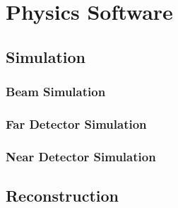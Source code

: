 \section{Physics Software}
\label{sec:detectors-sc-physics-software}

\subsection{Simulation}
\label{sec:detectors-sc-physics-software-simulation}

\subsubsection{Beam Simulation}
\label{sec:detectors-sc-physics-software-simulation-beam}

\subsubsection{Far Detector Simulation}
\label{sec:detectors-sc-physics-software-simulation-fd}


\subsubsection{Near Detector Simulation}
\label{sec:detectors-sc-physics-software-simulation-nd}
 


\subsection{Reconstruction}
\label{sec:detectors-sc-physics-software-reco}



